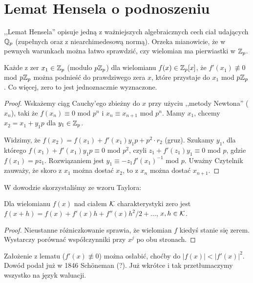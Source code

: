 \section{Lemat Hensela o podnoszeniu}
,,Lemat Hensela'' opisuje jedną z ważniejszych algebraicznych cech ciał udających $\mathbb Q_p$ (zupełnych oraz z niearchimedesową normą).
Orzeka mianowicie, że w pewnych warunkach można łatwo sprawdzić, czy wielomian ma pierwiastki w $\mathbb Z_p$.

\begin{twierdzenie}
	Każde z zer $x_1 \in \mathbb Z_p$ (modulo $p \mathbb Z_p$) dla wielomianu $f(x) \in \mathbb Z_p[x]$, że $f'(x_1) \not \equiv 0$ mod $p \mathbb Z_p$ można podnieść do prawdziwego zera $x$, które przystaje do $x_1$ mod $p\mathbb Z_p$.
	Co więcej, zero to jest jednoznacznie wyznaczone.
\end{twierdzenie}

\begin{proof}
	Wskażemy ciąg Cauchy'ego zbieżny do $x$ przy użyciu ,,metody Newtona'' ($x_n$), taki że $f(x_n) \equiv 0$ mod $p^n$ i $x_n \equiv x_{n+1}$ mod $p^n$.
	Mamy $x_1$, chcemy $x_2 = x_1 + y_1 p$ dla $y_1 \in \mathbb Z_p$.

	Widzimy, że $f(x_2) = f(x_1) + f'(x_1) y_1p + p^2 \cdot r_2$ (gruz).
	Szukamy $y_1$, dla którego $f(x_1) + f'(x_1) y_1p \equiv 0$ mod $p^2$, czyli $z_1 + f'(z_1) y_1 \equiv 0$ mod $p$, gdzie $f(x_1) = pz_1$. 
	Rozwiązaniem jest $y_1 \equiv -z_1 f'(x_1)^{-1}$ mod $p$.
	Uważny Czytelnik zauważy, że skoro z $x_1$ można dostać $x_2$, to z $x_n$ można dostać $x_{n+1}$.
\end{proof}

W dowodzie skorzystaliśmy ze wzoru Taylora:

\begin{fakt}
	Dla wielomianu $f(x)$ nad ciałem $\mathcal K$ charakterystyki zero jest $f(x+h) = f(x) + f'(x)h + f''(x)h^2 / 2 + \ldots$, $x, h \in \mathcal K$.
\end{fakt}

\begin{proof}
	Nieustanne różniczkowanie sprawia, że wielomian $f$ kiedyś stanie się zerem.
	Wystarczy porównać współczynniki przy $x^j$ po obu stronach.
\end{proof}

\begin{historia}\end{historia}

Założenie z lematu ($f'(x) \not\equiv 0$) można osłabić, choćby do $|f(x)| < |f'(x)|^2$.
Dowód podał już w 1846 Schöneman (?).
Już wkrótce i tak przetłumaczymy wszystko na język waluacji.

